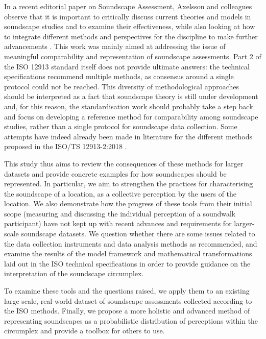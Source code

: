 In a recent editorial paper on Soundscape Assessment, Axelsson and colleagues observe that it is important to critically discuss current theories and models in soundscape studies and to examine their effectiveness, while also looking at how to integrate different methods and perspectives for the discipline to make further advancements \citep{Axelsson2019Editorial}. This work was mainly aimed at addressing the issue of meaningful comparability and representation of soundscape assessments. Part 2 of the ISO 12913 standard itself does not provide ultimate answers: the technical specifications recommend multiple methods, as consensus around a single protocol could not be reached. This diversity of methodological approaches should be interpreted as a fact that soundscape theory is still under development and, for this reason, the standardisation work should probably take a step back and focus on developing a reference method for comparability among soundscape studies, rather than a single protocol for soundscape data collection. Some attempts have indeed already been made in literature for the different methods proposed in the ISO/TS 12913-2:2018 \citep{Aletta2019Exploring, jo2020soundscape}. 

This study thus aims to review the consequences of these methods for larger datasets and provide concrete examples for how soundscapes should be represented. In particular, we aim to strengthen the practices for characterising the soundscape of a location, as a collective perception by the users of the location. We also demonstrate how the progress of these tools from their initial scope (measuring and discussing the individual perception of a soundwalk participant) have not kept up with recent advances and requirements for larger-scale soundscape datasets. We question whether there are some issues related to the data collection instruments and data analysis methods as recommended, and examine the results of the model framework and mathematical transformations laid out in the ISO technical specifications in order to provide guidance on the interpretation of the soundscape circumplex. 

To examine these tools and the questions raised, we apply them to an existing large scale, real-world dataset of soundscape assessments collected according to the ISO methods. Finally, we propose a more holistic and advanced method of representing soundscapes as a probabilistic distribution of perceptions within the circumplex and provide a toolbox for others to use.

